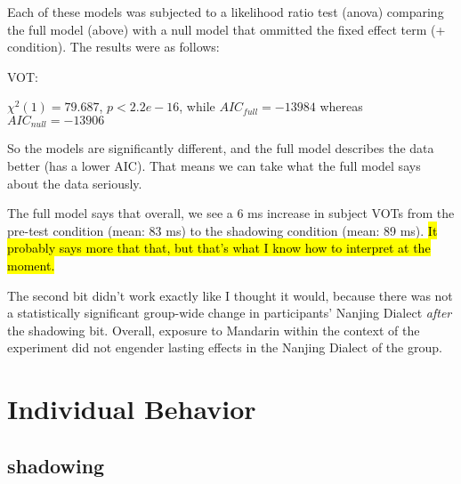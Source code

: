 Each of these models was subjected to a likelihood ratio test (anova) comparing the full model (above) with a null model that ommitted the fixed effect term (+ condition). The results were as follows:

VOT:

$\chi^2(1) = 79.687$, $p < 2.2e-16$, while $AIC_{full} = -13984$ whereas $AIC_{null} = -13906$

So the models are significantly different, and the full model describes the data better (has a lower AIC). That means we can take what the full model says about the data seriously.

The full model says that overall, we see a 6 ms increase in subject VOTs from the pre-test condition (mean: 83 ms) to the shadowing condition (mean: 89 ms). \hl{It probably says more that that, but that's what I know how to interpret at the moment.}

The second bit didn't work exactly like I thought it would, because there was not a statistically significant group-wide change in participants' Nanjing Dialect \textit{after} the shadowing bit. Overall, exposure to Mandarin within the context of the experiment did not engender lasting effects in the Nanjing Dialect of the group.

\section{Individual Behavior}
\label{sec:expint:individual}
\subsection{shadowing}
